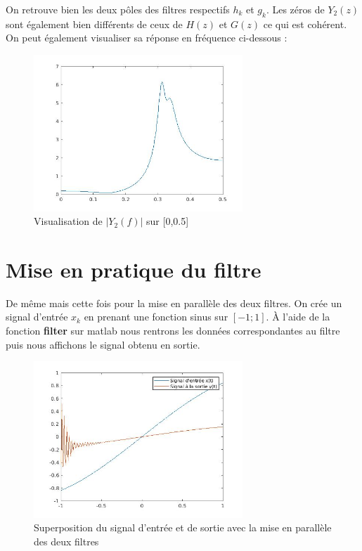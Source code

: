 \documentclass[12,french]{report}
\begin{document}
On retrouve bien les deux pôles des filtres respectifs $h_k$ et $g_k$. Les zéros de $Y_2(z)$ sont également bien différents de ceux de $H(z)$ et $G(z)$ ce qui est cohérent.\\

On peut également visualiser sa réponse en fréquence ci-dessous :

\begin{figure}[H]
	\center
	\includegraphics[width=0.7\textwidth]{./Images/freqz_Y2}
	\caption{Visualisation de $|Y_2(f)|$ sur [0,0.5]}
\end{figure}\vspace{0.2cm}


\section{Mise en pratique du filtre}

De même mais cette fois pour la mise en parallèle des deux filtres. On crée un signal d'entrée $x_k$ en prenant une fonction sinus sur $[-1;1]$.
À l'aide de la fonction \textbf{filter} sur matlab nous rentrons les données correspondantes au filtre puis nous affichons le signal obtenu en sortie.

\begin{figure}[H]
	\center
	\includegraphics[width=0.7\textwidth]{./Images/filterparallele}
	\caption{Superposition du signal d'entrée et de sortie avec la mise en parallèle des deux filtres}
\end{figure}\vspace{0.2cm}
\end{document}

